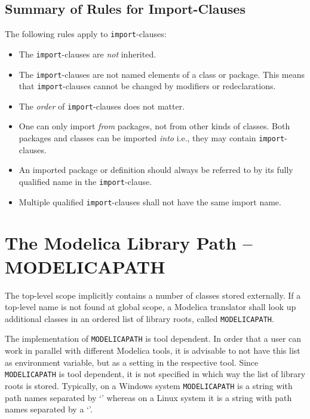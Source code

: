 \subsection{Summary of Rules for Import-Clauses}\label{summary-of-rules-for-import-clauses}

The following rules apply to \lstinline!import!-clauses:
\begin{itemize}
\item
  The \lstinline!import!-clauses are \emph{not} inherited.
\item
  The \lstinline!import!-clauses are not named elements of a class or package.
  This means that \lstinline!import!-clauses cannot be changed by modifiers or redeclarations.
\item
  The \emph{order} of \lstinline!import!-clauses does not matter.
\item
  One can only import \emph{from} packages, not from other kinds of classes.
  Both packages and classes can be imported \emph{into} i.e., they may contain \lstinline!import!-clauses.
\item
  An imported package or definition should always be referred to by its fully qualified name in the \lstinline!import!-clause.
\item
  Multiple qualified \lstinline!import!-clauses shall not have the same import name.
\end{itemize}

\section{The Modelica Library Path -- MODELICAPATH}\label{the-modelica-library-path-modelicapath}

The top-level scope implicitly contains a number of classes stored externally.
If a top-level name is not found at global scope, a Modelica translator shall look up additional classes in an ordered list of library roots, called \lstinline!MODELICAPATH!.

\begin{nonnormative}
The implementation of \lstinline!MODELICAPATH! is tool dependent.  In order that a user can work in parallel with different Modelica tools, it is advisable to not
have this list as environment variable, but as a setting in the respective tool.  Since \lstinline!MODELICAPATH! is tool dependent, it is not specified in which way
the list of library roots is stored.  Typically, on a Windows system \lstinline!MODELICAPATH! is a string with path names separated by `\filename{;}' whereas on a Linux system
it is a string with path names separated by a `\filename{:}'.
\end{nonnormative}

